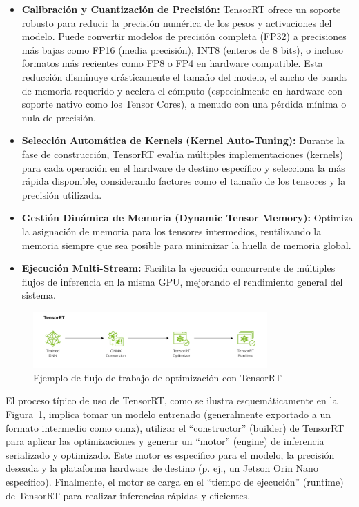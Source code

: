 \documentclass[11pt,spanish,listoffigures,listoftables]{tfgetsinf}
\begin{document}
\begin{itemize}
   \item \textbf{Calibración y Cuantización de Precisión:} TensorRT ofrece un soporte robusto para reducir la precisión numérica de los pesos y activaciones del modelo. Puede convertir modelos de precisión completa (FP32) a precisiones más bajas como FP16 (media precisión), INT8 (enteros de 8 bits), o incluso formatos más recientes como FP8 o FP4 en hardware compatible. Esta reducción disminuye drásticamente el tamaño del modelo, el ancho de banda de memoria requerido y acelera el cómputo (especialmente en hardware con soporte nativo como los Tensor Cores), a menudo con una pérdida mínima o nula de precisión.
   \item \textbf{Selección Automática de Kernels (Kernel Auto-Tuning):} Durante la fase de construcción, TensorRT evalúa múltiples implementaciones (kernels) para cada operación en el hardware de destino específico y selecciona la más rápida disponible, considerando factores como el tamaño de los tensores y la precisión utilizada.
   \item \textbf{Gestión Dinámica de Memoria (Dynamic Tensor Memory):} Optimiza la asignación de memoria para los tensores intermedios, reutilizando la memoria siempre que sea posible para minimizar la huella de memoria global.
   \item \textbf{Ejecución Multi-Stream:} Facilita la ejecución concurrente de múltiples flujos de inferencia en la misma GPU, mejorando el rendimiento general del sistema.
\end{itemize}

\begin{figure}[H]
   \centering
   \includegraphics[width=0.8\textwidth]{images/estado_del_arte/TensorRT_pipeline.png}
   \caption[Ejemplo de flujo de trabajo de optimización con TensorRT]{Ejemplo de flujo de trabajo de optimización con TensorRT}
   \label{fig:tensorrt_architecture}
\end{figure}

El proceso típico de uso de TensorRT, como se ilustra esquemáticamente en la Figura~\ref{fig:tensorrt_architecture}, implica tomar un modelo entrenado (generalmente exportado a un formato intermedio como \gls{onnx}), utilizar el ``constructor'' (builder) de TensorRT para aplicar las optimizaciones y generar un ``motor'' (engine) de inferencia serializado y optimizado. Este motor es específico para el modelo, la precisión deseada y la plataforma hardware de destino (p. ej., un Jetson Orin Nano específico). Finalmente, el motor se carga en el ``tiempo de ejecución'' (runtime) de TensorRT para realizar inferencias rápidas y eficientes.
\end{document}
